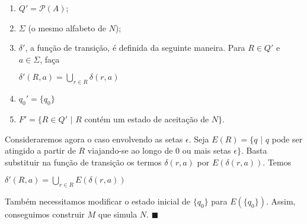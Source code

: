 \documentclass[12pt,a4paper,oneside]{article}
\begin{document}
	\begin{enumerate}
		\item $Q' = \mathcal{P}(A)$;
		\item $\Sigma$ (o mesmo alfabeto de $N$);
		\item $\delta'$, a função de transição, é definida da seguinte maneira. Para $R \in Q'$ e $a \in \Sigma$, faça 
			\begin{center}
				$\delta'(R,a) = \bigcup\limits_{r \in R} \delta (r,a)$
			\end{center}
		\item $q_0' = \{ q_0 \}$
		\item $F' = \{ R \in Q' \mbox{ | } R$ contém um estado de aceitação de $N \}$.
	\end{enumerate}

Consideraremos agora o caso envolvendo as setas $\epsilon$. Seja $E(R) = \{q \mbox{ | } q$ pode ser atingido a partir de $R$ viajando-se ao longo de 0 ou mais setas $\epsilon \}$. Basta substituir na função de transição os termos $\delta(r,a)$ por $E(\delta(r,a))$. Temos
			\begin{center}
				$\delta'(R,a) = \bigcup\limits_{r \in R} E(\delta (r,a))$
			\end{center}
Também necessitamos modificar o estado inicial de $\{ q_0 \}$ para $E(\{ q_0 \})$. Assim, conseguimos construir $M$ que simula $N$. $\blacksquare$
\end{document}
